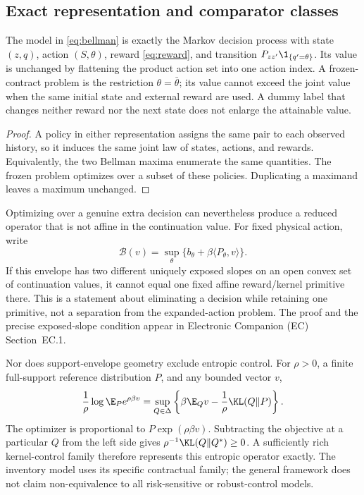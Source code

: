 \subsection{Exact representation and comparator classes}\label{sec:representation}
\begin{proposition}\label{prop:expanded}
The model in \eqref{eq:bellman} is exactly the Markov decision process with state $(z,q)$, action $(S,\theta)$, reward \eqref{eq:reward}, and transition $P_{zz'}\1_{\{q'=\theta\}}$. Its value is unchanged by flattening the product action set into one action index. A frozen-contract problem is the restriction $\theta=\bar\theta$; its value cannot exceed the joint value when the same initial state and external reward are used. A dummy label that changes neither reward nor the next state does not enlarge the attainable value.
\end{proposition}
\begin{proof}
A policy in either representation assigns the same pair to each observed history, so it induces the same joint law of states, actions, and rewards. Equivalently, the two Bellman maxima enumerate the same quantities. The frozen problem optimizes over a subset of these policies. Duplicating a maximand leaves a maximum unchanged.\end{proof}

Optimizing over a genuine extra decision can nevertheless produce a reduced operator that is not affine in the continuation value. For fixed physical action, write
\begin{equation}\label{eq:support}
 \mathcal B(v)=\sup_{\theta}\{b_\theta+\beta\langle P_\theta,v\rangle\}.
\end{equation}
If this envelope has two different uniquely exposed slopes on an open convex set of continuation values, it cannot equal one fixed affine reward/kernel primitive there. This is a statement about eliminating a decision while retaining one primitive, not a separation from the expanded-action problem. The proof and the precise exposed-slope condition appear in Electronic Companion (EC) Section~EC.1.

Nor does support-envelope geometry exclude entropic control. For $\rho>0$, a finite full-support reference distribution $P$, and any bounded vector $v$,
\begin{equation}\label{eq:gibbs}
 \frac1\rho\log\E_P e^{\rho\beta v}
 =\sup_{Q\in\Delta}\left\{\beta\E_Qv-\frac1\rho\KL(Q\Vert P)\right\}.
\end{equation}
The optimizer is proportional to $P\exp(\rho\beta v)$. Subtracting the objective at a particular $Q$ from the left side gives $\rho^{-1}\KL(Q\Vert Q^*)\geq0$. A sufficiently rich kernel-control family therefore represents this entropic operator exactly. The inventory model uses its specific contractual family; the general framework does not claim non-equivalence to all risk-sensitive or robust-control models.

